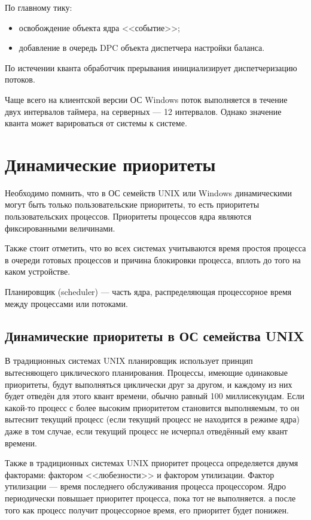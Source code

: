 По главному тику:
\begin{itemize}
  \item освобождение объекта ядра <<событие>>;
  \item добавление в очередь DPC объекта диспетчера настройки баланса.
\end{itemize}

По истечении кванта обработчик прерывания инициализирует диспетчеризацию потоков.

Чаще всего на клиентской версии ОС Windows поток выполняется в течение двух
интервалов таймера, на серверных --- 12 интервалов. Однако значение
кванта может варироваться от системы к системе. 

\chapter{Динамические приоритеты}

Необходимо помнить, что в ОС семейств UNIX или Windows
динамическими могут быть только пользовательские приоритеты, то есть
приоритеты пользовательских процессов. Приоритеты
процессов ядра являются фиксированными величинами.

Также стоит отметить, что во всех системах учитываются 
время простоя процесса в очереди готовых процессов и причина
блокировки процесса, вплоть до того на каком устройстве.

Планировщик (scheduler) --- часть ядра, распределяющая процессорное время
между процессами или потоками.

\section{Динамические приоритеты в ОС семейства UNIX}

В традиционных системах UNIX планировщик использует принцип
вытесняющего циклического планирования. Процессы, имеющие одинаковые
приоритеты, будут выполняться циклически друг за другом, и каждому из них
будет отведён для этого квант времени, обычно равный 100 миллисекундам. Если
какой-то процесс с более высоким приоритетом становится выполняемым, то он 
вытеснит текущий процесс (если текущий процесс не находится в режиме ядра)
даже в том случае, если текущий процесс не исчерпал отведённый ему квант времени.

Также в традиционных системах UNIX приоритет процесса определяется двумя факторами:
фактором <<любезности>> и фактором утилизации. Фактор утилизации ---
время последнего обслуживания процесса процессором. Ядро периодически
повышает приоритет процесса, пока тот не выполняется. а после того как процесс
получит процессорное время, его приоритет будет понижен.

